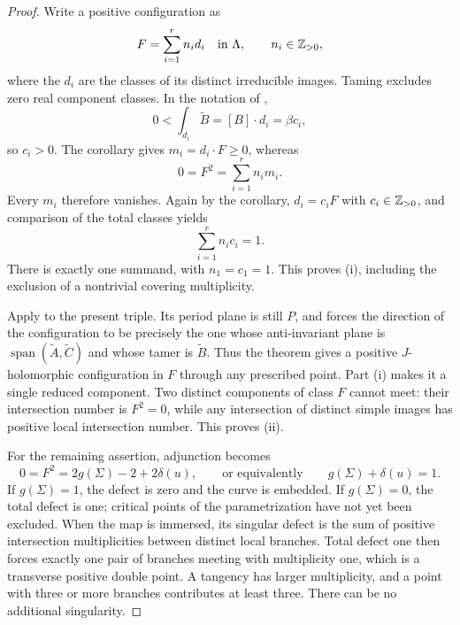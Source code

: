 \begin{proof}
Write a positive configuration as
\[
  F=\sum_{i=1}^r n_i d_i\quad\hbox{in }\Lambda,
  \qquad n_i\in\mathbb Z_{>0},
\]
where the \(d_i\) are the classes of its distinct irreducible images.
Taming excludes zero real component classes.  In the notation of
,
\[
  0<\int_{d_i}\widetilde B=[B]\cdot d_i=\beta c_i,
\]
so \(c_i>0\).  The corollary gives \(m_i=d_i\cdot F\geq0\), whereas
\[
  0=F^2=\sum_{i=1}^r n_i m_i.
\]
Every \(m_i\) therefore vanishes.  Again by the corollary,
\(d_i=c_iF\) with \(c_i\in\mathbb Z_{>0}\), and comparison of the total
classes yields
\begin{equation}
\label{eq:lattice-no-splitting}
  \sum_{i=1}^r n_i c_i=1.
\end{equation}
There is exactly one summand, with \(n_1=c_1=1\).  This proves
\textup{(i)}, including the exclusion of a nontrivial covering
multiplicity.

Apply  to the present triple.  Its period
plane is still \(P\), and  forces the
direction of the configuration to be precisely the one whose
anti-invariant plane is
\(\operatorname{span}(\widetilde A,\widetilde C)\) and whose tamer is
\(\widetilde B\).  Thus the theorem gives a positive \(J\)-holomorphic
configuration in \(F\) through any prescribed point.  Part
\textup{(i)} makes it a single reduced component.  Two distinct
components of class \(F\) cannot meet: their intersection number is
\(F^2=0\), while any intersection of distinct simple images has
positive local intersection number.  This proves \textup{(ii)}.

For the remaining assertion, adjunction becomes
\[
  0=F^2=2g(\Sigma)-2+2\delta(u),
  \qquad\text{or equivalently}\qquad g(\Sigma)+\delta(u)=1.
\]
If \(g(\Sigma)=1\), the defect is zero and the curve is embedded.
If \(g(\Sigma)=0\), the total defect is one; critical points of the
parametrization have not yet been excluded.  When the map is
immersed, its singular defect is the sum of positive intersection
multiplicities between distinct local branches.  Total defect one
then forces exactly one pair of branches meeting with multiplicity
one, which is a transverse positive double point.  A tangency has
larger multiplicity, and a point with three or more branches
contributes at least three.  There can be no additional singularity.
\end{proof}
